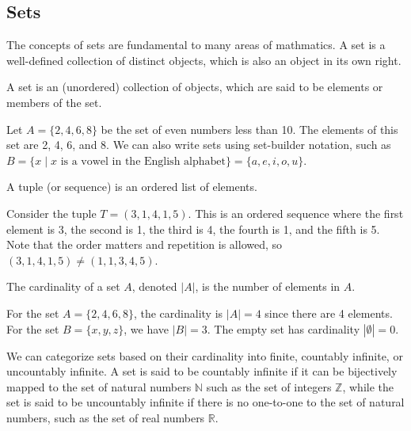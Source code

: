 \documentclass[12pt]{article}
\begin{document}
\subsection{Sets}

The concepts of sets are fundamental to many areas of mathmatics. A set is a well-defined collection of distinct objects, which is also an object in its own right. 

\begin{definition}[Set]
    A set is an (unordered) collection of objects, which are said to be elements or members of the set.
\end{definition}

Let $A = \{2, 4, 6, 8\}$ be the set of even numbers less than 10. The elements of this set are 2, 4, 6, and 8. We can also write sets using set-builder notation, such as $B = \{x \mid x \text{ is a vowel in the English alphabet}\} = \{a, e, i, o, u\}$.

\vspace{12pt}


\begin{definition}[Tuple]
    A tuple (or sequence) is an ordered list of elements. 
\end{definition}

Consider the tuple $T = (3, 1, 4, 1, 5)$. This is an ordered sequence where the first element is 3, the second is 1, the third is 4, the fourth is 1, and the fifth is 5. Note that the order matters and repetition is allowed, so $(3, 1, 4, 1, 5) \neq (1, 1, 3, 4, 5)$.


\vspace{12pt}


\begin{definition}[Cardinality]
    The cardinality of a set $A$, denoted $\vert A \vert$, is the number of elements in $A$.
\end{definition}

For the set $A = \{2, 4, 6, 8\}$, the cardinality is $|A| = 4$ since there are 4 elements. For the set $B = \{x, y, z\}$, we have $|B| = 3$. The empty set has cardinality $|\emptyset| = 0$.


We can categorize sets based on their cardinality into finite, countably infinite, or uncountably infinite. A set is said to be countably infinite if it can be bijectively mapped to the set of natural numbers $\mathbb{N}$ such as the set of integers $\mathbb{Z}$, while the set is said to be uncountably infinite if there is no one-to-one to the set of natural numbers, such as the set of real numbers $\mathbb{R}$.
\end{document}

